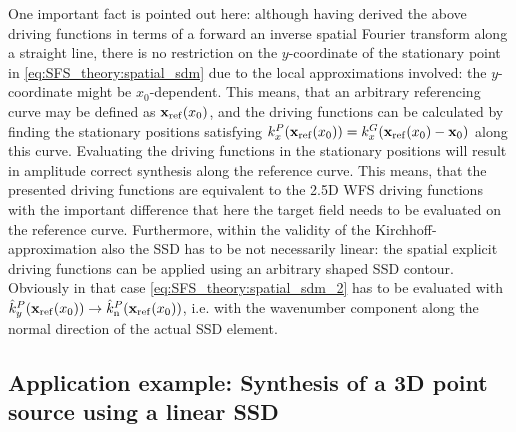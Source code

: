 One important fact is pointed out here: although having derived the above driving functions in terms of a forward an inverse spatial Fourier transform along a straight line, there is no restriction on the $y$-coordinate of the stationary point in \eqref{eq:SFS_theory:spatial_sdm} due to the local approximations involved: the $y$-coordinate might be $x_0$-dependent.
This means, that an arbitrary referencing curve may be defined as $\mathbf{x}_{\mathrm{ref}}(x_0)$, and the driving functions can be calculated by finding the stationary positions 
satisfying $k_x^P(\mathbf{x}_{\mathrm{ref}}(x_0)) = k_x^G(\mathbf{x}_{\mathrm{ref}}(x_0) - \mathbf{x}_0)$ along this curve.
Evaluating the driving functions in the stationary positions will result in amplitude correct synthesis along the reference curve. 
This means, that the presented driving functions are equivalent to the 2.5D WFS driving functions with the important difference that here the target field needs to be evaluated on the reference curve.
Furthermore, within the validity of the Kirchhoff-approximation also the SSD has to be not necessarily linear: the spatial explicit driving functions can be applied using an arbitrary shaped SSD contour.
Obviously in that case \eqref{eq:SFS_theory:spatial_sdm_2} has to be evaluated with $\hat{k}_y^{P}(\mathbf{x}_{\mathrm{ref}}(x_0)) \rightarrow \hat{k}_{\mathrm{n}}^{P}(\mathbf{x}_{\mathrm{ref}}(x_0))$, i.e. with the wavenumber component along the normal direction of the actual SSD element.

\subsection*{Application example: Synthesis of a 3D point source using a linear SSD}

